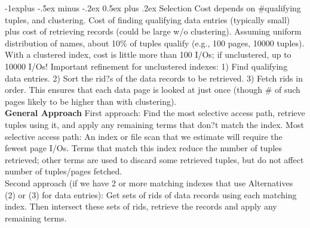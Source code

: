 \documentclass[10pt,landscape]{article}
\makeatletter
\renewcommand{\subsection}{\@startsection{subsection}{2}{0mm}%
                                {-1explus -.5ex minus -.2ex}%
                                {0.5ex plus .2ex}%
                                {\normalfont\normalsize\bfseries}}
\makeatother
\begin{document}
\begin{multicols}{3}
\subsection{Selection}
Cost depends on \#qualifying tuples, and clustering. Cost of finding qualifying data entries (typically small) plus cost of retrieving records (could be large w/o clustering). Assuming uniform distribution of names, about 10\% of tuples qualify (e.g., 100 pages, 10000 tuples). With a clustered index, cost is little more than 100 I/Os; if unclustered, up to 10000 I/Os! Important refinement for unclustered indexes: 1) Find qualifying data entries. 2)  Sort the rid?s of the data records to be retrieved. 3) Fetch rids in order. This ensures that each data page is looked at just once (though \# of such pages likely to be higher than with clustering).\\
{\bf General Approach}  First approach: Find the most selective access path, retrieve tuples using it, and apply any remaining terms that don?t match the index. Most selective access path: An index or file scan that we estimate will require the fewest page I/Os. Terms that match this index reduce the number of tuples retrieved; other terms are used to discard some retrieved tuples, but do not affect number of tuples/pages fetched. \\
Second approach (if we have 2 or more matching indexes that use Alternatives (2) or (3) for data entries): Get sets of rids of data records using each matching index. Then intersect these sets of rids, retrieve the records and apply any remaining terms.


\end{multicols}
\end{document}
